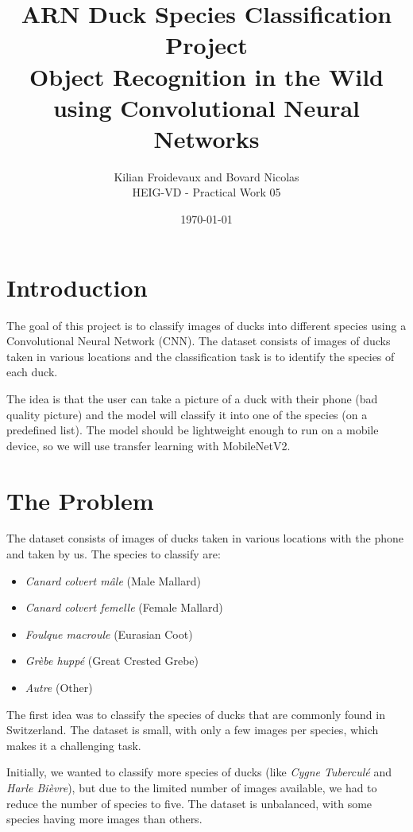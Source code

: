 \documentclass[12pt,a4paper]{article}
\title{\textbf{ARN Duck Species Classification Project}\\
\large Object Recognition in the Wild using Convolutional Neural Networks}
\author{Kilian Froidevaux and Bovard Nicolas\\HEIG-VD - Practical Work 05}
\date{\today}
\begin{document}
\maketitle

\tableofcontents
\clearpage

\section{Introduction}

The goal of this project is to classify images of ducks into different species using a Convolutional Neural Network (CNN). The dataset consists of images of ducks taken in various locations and the classification task is to identify the species of each duck.

The idea is that the user can take a picture of a duck with their phone (bad quality picture) and the model will classify it into one of the species (on a predefined list). The model should be lightweight enough to run on a mobile device, so we will use transfer learning with MobileNetV2.

\section{The Problem}

The dataset consists of images of ducks taken in various locations with the phone and taken by us. The species to classify are:

\begin{itemize}
    \item \textit{Canard colvert mâle} (Male Mallard)
    \item \textit{Canard colvert femelle} (Female Mallard)
    \item \textit{Foulque macroule} (Eurasian Coot)
    \item \textit{Grèbe huppé} (Great Crested Grebe)
    \item \textit{Autre} (Other)
\end{itemize}

The first idea was to classify the species of ducks that are commonly found in Switzerland. The dataset is small, with only a few images per species, which makes it a challenging task.

Initially, we wanted to classify more species of ducks (like \textit{Cygne Tuberculé} and \textit{Harle Bièvre}), but due to the limited number of images available, we had to reduce the number of species to five. The dataset is unbalanced, with some species having more images than others.
\end{document}
